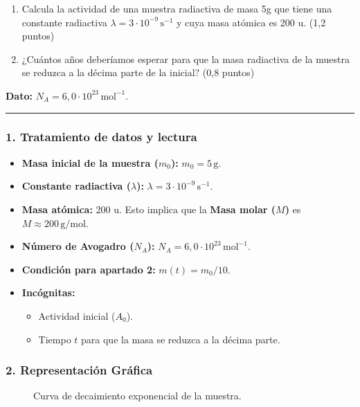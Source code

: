 \begin{cajaenunciado}
\begin{enumerate}
    \item Calcula la actividad de una muestra radiactiva de masa 5g que tiene una constante radiactiva $\lambda=3\cdot10^{-9}\,\text{s}^{-1}$ y cuya masa atómica es 200 u. (1,2 puntos)
    \item ¿Cuántos años deberíamos esperar para que la masa radiactiva de la muestra se reduzca a la décima parte de la inicial? (0,8 puntos)
\end{enumerate}
\textbf{Dato:} $N_A=6,0\cdot10^{23}\,\text{mol}^{-1}$.
\end{cajaenunciado}
\hrule

\subsubsection*{1. Tratamiento de datos y lectura}
\begin{itemize}
    \item \textbf{Masa inicial de la muestra ($m_0$):} $m_0 = 5\,\text{g}$.
    \item \textbf{Constante radiactiva ($\lambda$):} $\lambda = 3 \cdot 10^{-9}\,\text{s}^{-1}$.
    \item \textbf{Masa atómica:} 200 u. Esto implica que la \textbf{Masa molar ($M$)} es $M \approx 200\,\text{g/mol}$.
    \item \textbf{Número de Avogadro ($N_A$):} $N_A = 6,0 \cdot 10^{23}\,\text{mol}^{-1}$.
    \item \textbf{Condición para apartado 2:} $m(t) = m_0/10$.
    \item \textbf{Incógnitas:}
    \begin{itemize}
        \item Actividad inicial ($A_0$).
        \item Tiempo $t$ para que la masa se reduzca a la décima parte.
    \end{itemize}
\end{itemize}

\subsubsection*{2. Representación Gráfica}
\begin{figure}[H]
    \centering
    \caption{Curva de decaimiento exponencial de la muestra.}
\end{figure}

